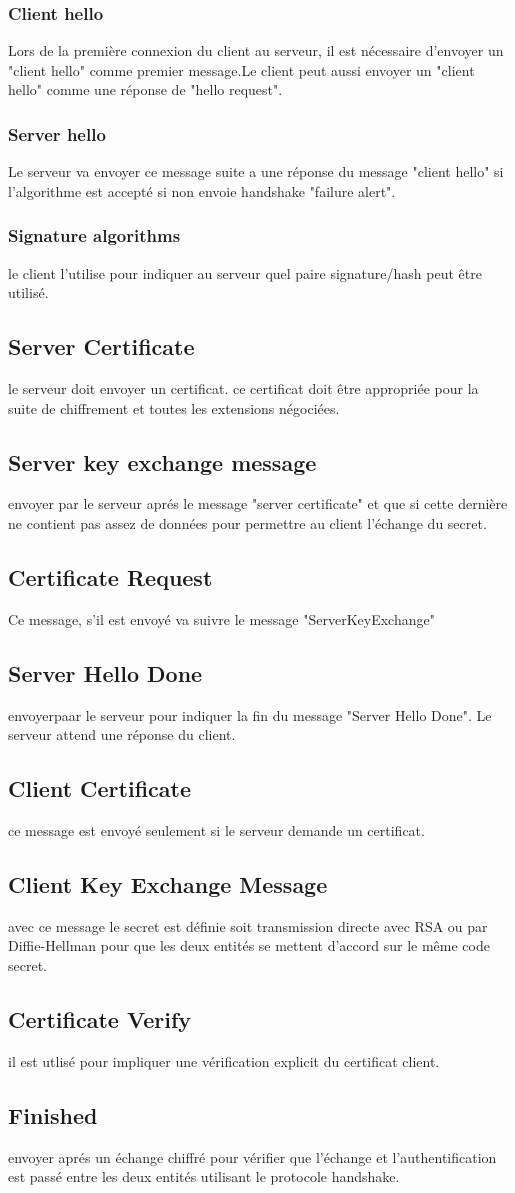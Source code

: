 \documentclass[11pt]{article}
\begin{document}
\subsubsection {Client hello}
Lors de la première connexion du client au serveur, il est nécessaire d'envoyer un "client hello" comme premier message.Le client peut aussi envoyer un "client hello" comme une réponse de "hello request".
\subsubsection {Server hello}
Le serveur va envoyer ce message suite a une réponse du message "client hello" si l'algorithme est accepté si non envoie handshake "failure alert".
\subsubsection {Signature algorithms}
le client l'utilise pour indiquer au serveur quel paire signature/hash peut \^etre utilisé.
\subsection {Server Certificate}
le serveur doit envoyer un certificat.
ce certificat doit être appropriée pour  la suite de chiffrement et toutes les extensions négociées.
\subsection {Server key exchange message}
envoyer par le serveur aprés le message "server certificate" et que si cette dernière ne contient pas assez de données pour permettre au client l'échange du secret.
\subsection {Certificate Request}
Ce message, s'il est envoyé va suivre le message "ServerKeyExchange"
\subsection {Server Hello Done}
envoyerpaar le serveur pour indiquer la fin du message "Server Hello Done". Le serveur attend une réponse du client.
\subsection {Client Certificate}
ce message est envoyé seulement si le serveur demande un certificat.
\subsection {Client Key Exchange Message}
avec ce message le secret est définie soit transmission directe avec RSA ou par Diffie-Hellman pour que les deux entités se mettent d'accord sur le même code secret.
\subsection {Certificate Verify}
il est utlisé pour impliquer une vérification explicit du certificat client.
\subsection {Finished}
envoyer aprés un échange chiffré pour vérifier que l'échange et l'authentification est passé entre les deux entités utilisant le protocole handshake.
\end{document}
